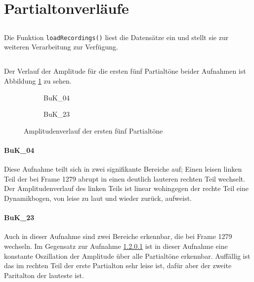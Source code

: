 \section{Partialtonverläufe}
\label{sec:1}

\subsection{}
Die Funktion \texttt{loadRecordings()} liest die Datensätze ein und stellt sie zur weiteren Verarbeitung zur Verfügung.

\subsection{}
Der Verlauf der Amplitude für die ersten fünf Partialtöne beider Aufnahmen ist Abbildung \ref{fig:ampl} zu sehen.

\begin{figure}[tbh]
    \centering
    \begin{subfigure}{.5\textwidth}
        \centering
        \caption{BuK\_04}
        \scalebox{0.5}{}
    \end{subfigure}%
    \begin{subfigure}{.5\textwidth}
        \centering
        \caption{BuK\_23}
        \scalebox{0.5}{}
    \end{subfigure}
    \caption{Amplitudenverlauf der ersten fünf Partialtöne}
    \label{fig:ampl}
\end{figure}

\paragraph{BuK\_04}
\label{par:04_amp}
Diese Aufnahme teilt sich in zwei signifikante Bereiche auf;
Einen leisen linken Teil der bei Frame 1279 abrupt in einen deutlich lauteren rechten Teil wechselt.
Der Amplitudenverlauf des linken Teils ist linear wohingegen der rechte Teil eine Dynamikbogen, von leise zu laut und wieder zurück, aufweist.

\paragraph{BuK\_23}
Auch in dieser Aufnahme sind zwei Bereiche erkennbar, die bei Frame 1279 wechseln.
Im Gegensatz zur Aufnahme \ref{par:04_amp} ist in dieser Aufnahme eine konstante Oszillation der Amplitude über alle Partialtöne erkennbar.
Auffällig ist das im rechten Teil der erste Partialton sehr leise ist, dafür aber der zweite Paritalton der lauteste ist.


